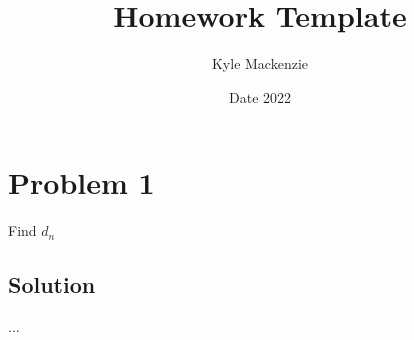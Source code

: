 \documentclass[11pt, fleqn]{article}
\title{Homework Template}
\author{Kyle Mackenzie}
\date{Date 2022}
\begin{document}
\allowdisplaybreaks

\maketitle

\pagebreak

\section*{Problem 1}

Find $d_n$

\subsection*{Solution}

...
\end{document}
